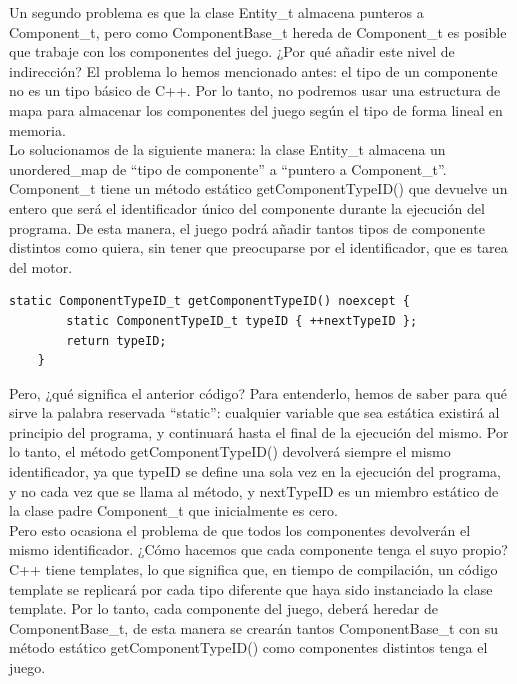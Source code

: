 Un segundo problema es que la clase Entity\_t almacena punteros a Component\_t, pero como ComponentBase\_t hereda de Component\_t es posible que trabaje con los componentes del juego. ¿Por qué añadir este nivel de indirección? El problema lo hemos mencionado antes: el tipo de un componente no es un tipo básico de C++. Por lo tanto, no podremos usar una estructura de mapa para almacenar los componentes del juego según el tipo de forma lineal en memoria.
\\
Lo solucionamos de la siguiente manera: la clase Entity\_t almacena un unordered\_map de ``tipo de componente'' a ``puntero a Component\_t''. Component\_t tiene un método estático getComponentTypeID() que devuelve un entero que será el identificador único del componente durante la ejecución del programa. De esta manera, el juego podrá añadir tantos tipos de componente distintos como quiera, sin tener que preocuparse por el identificador, que es tarea del motor.
\begin{lstlisting}[style=C-color, caption={Cómo poder tener un número variable de componentes, sin tener que añadir un nuevo identificador con cada componente nuevo.},label=C_code-color]
	static ComponentTypeID_t getComponentTypeID() noexcept {
		static ComponentTypeID_t typeID { ++nextTypeID };
		return typeID;
	}
\end{lstlisting}
Pero, ¿qué significa el anterior código? Para entenderlo, hemos de saber para qué sirve la palabra reservada ``static'': cualquier variable que sea estática existirá al principio del programa, y continuará hasta el final de la ejecución del mismo. Por lo tanto, el método getComponentTypeID() devolverá siempre el mismo identificador, ya que typeID se define una sola vez en la ejecución del programa, y no cada vez que se llama al método, y nextTypeID es un miembro estático de la clase padre Component\_t que inicialmente es cero.
\\
Pero esto ocasiona el problema de que todos los componentes devolverán el mismo identificador. ¿Cómo hacemos que cada componente tenga el suyo propio? C++ tiene templates, lo que significa que, en tiempo de compilación, un código template se replicará por cada tipo diferente que haya sido instanciado la clase template. Por lo tanto, cada componente del juego, deberá heredar de ComponentBase\_t, de esta manera se crearán tantos ComponentBase\_t con su método estático getComponentTypeID() como componentes distintos tenga el juego.

